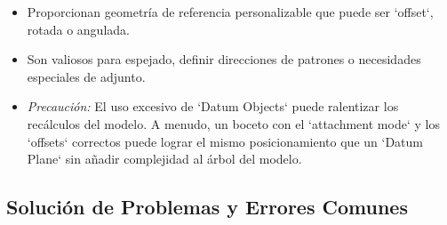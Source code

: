 \documentclass[12pt]{article}
\begin{document}
\begin{itemize}[label=\textbullet]
    \begin{itemize}[label=\textendash]
        \item Proporcionan geometría de referencia personalizable que puede ser `offset`, rotada o angulada.
        \item Son valiosos para espejado, definir direcciones de patrones o necesidades especiales de adjunto.
        \item \textit{Precaución:} El uso excesivo de `Datum Objects` puede ralentizar los recálculos del modelo. A menudo, un boceto con el `attachment mode` y los `offsets` correctos puede lograr el mismo posicionamiento que un `Datum Plane` sin añadir complejidad al árbol del modelo.
    \end{itemize}
\end{itemize}

\subsection{Solución de Problemas y Errores Comunes}
\end{document}
